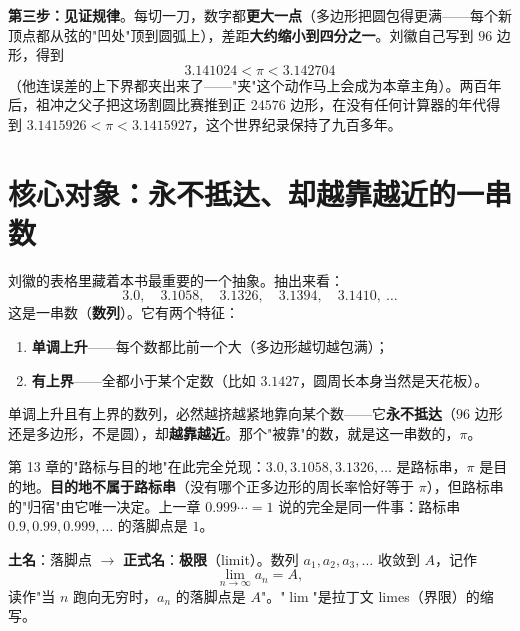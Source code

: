 
\textbf{第三步：见证规律}。每切一刀，数字都\textbf{更大一点}（多边形把圆包得更满——每个新顶点都从弦的"凹处"顶到圆弧上），差距\textbf{大约缩小到四分之一}。刘徽自己写到 $96$ 边形，得到
\[
3.141024 < \pi < 3.142704
\]
（他连误差的上下界都夹出来了——"夹"这个动作马上会成为本章主角）。两百年后，祖冲之父子把这场割圆比赛推到正 $24576$ 边形，在没有任何计算器的年代得到 $3.1415926 < \pi < 3.1415927$，这个世界纪录保持了九百多年。

\section{核心对象：永不抵达、却越靠越近的一串数}

刘徽的表格里藏着本书最重要的一个抽象。抽出来看：
\[
3.0,\quad 3.1058,\quad 3.1326,\quad 3.1394,\quad 3.1410,\ \dots
\]
这是一串数（\textbf{数列}）。它有两个特征：
\begin{enumerate}
\item \textbf{单调上升}——每个数都比前一个大（多边形越切越包满）；
\item \textbf{有上界}——全都小于某个定数（比如 $3.1427$，圆周长本身当然是天花板）。
\end{enumerate}
单调上升且有上界的数列，必然越挤越紧地靠向某个数——它\textbf{永不抵达}（$96$ 边形还是多边形，不是圆），却\textbf{越靠越近}。那个"被靠"的数，就是这一串数的，$\pi$。

第 13 章的"路标与目的地"在此完全兑现：$3.0, 3.1058, 3.1326, \dots$ 是路标串，$\pi$ 是目的地。\textbf{目的地不属于路标串}（没有哪个正多边形的周长率恰好等于 $\pi$），但路标串的"归宿"由它唯一决定。上一章 $0.999\cdots = 1$ 说的完全是同一件事：路标串 $0.9, 0.99, 0.999, \dots$ 的落脚点是 $1$。

\begin{faming}
\textbf{土名}：落脚点 $\to$ \textbf{正式名}：\textbf{极限}（limit）。数列 $a_1, a_2, a_3, \dots$ 收敛到 $A$，记作
\[
\lim_{n\to\infty} a_n = A ,
\]
读作"当 $n$ 跑向无穷时，$a_n$ 的落脚点是 $A$"。"$\lim$"是拉丁文 limes（界限）的缩写。
\end{faming}

